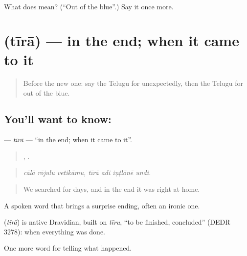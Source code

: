 \begin{tcolorbox}[breakable,colback=teal!4,colframe=teal!35!black,title={Before you move on}]
What does  mean? (\textquotedblleft{}Out of the blue\textquotedblright{}.) Say it once more.
\end{tcolorbox}
\section[\texorpdfstring{\te{తీరా} (tīrā)}{తీరా (tīrā)}]{ (tīrā) — in the end; when it came to it}

\label{lesson:TE-C340-tira}



\begin{quote}
Before the new one: say the Telugu for unexpectedly, then the Telugu for out of the blue.
\end{quote}

\subsection*{You'll want to know: }
\textbf{} — \emph{tīrā} — \textquotedblleft{}in the end; when it came to it\textquotedblright{}.

\begin{quote}
  ,    .
\end{quote}

\begin{quote}
\emph{cālā rōjulu vetikāmu, tīrā adi iṇṭlōnē undi.}
\end{quote}

\begin{quote}
We searched for days, and in the end it was right at home.
\end{quote}

A spoken word that brings a surprise ending, often an ironic one.

\begin{cousinweb}
\textbf{} (\emph{tīrā}) is native Dravidian, built on \emph{tīru}, \textquotedblleft{}to be finished, concluded\textquotedblright{} (DEDR 3278): when everything was done.
\end{cousinweb}

\begin{grammarlens}[title={What you've built}]
One more word for telling what happened.
\end{grammarlens}

